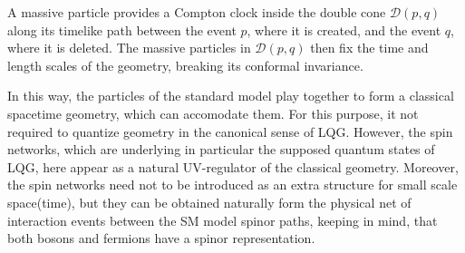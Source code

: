 \documentclass[11pt,a4paper]{article}
\theoremstyle{definition}
\begin{document}
	A massive particle provides a Compton clock inside the double cone $\mathcal{D}(p,q)$ along its timelike path between the event $p$, where it is created, and the event $q$, where it is deleted. 
	The massive particles in $\mathcal{D}(p,q)$ then fix the time and length scales of the geometry, breaking its conformal invariance. 
	
	In this way, the particles of the standard model play together to form a classical spacetime geometry,
	which can accomodate them. For this purpose, it not required to quantize geometry in the canonical 
	sense of LQG. However, the spin networks, which are underlying in particular the supposed quantum states of LQG, here appear as a natural UV-regulator of the classical geometry. Moreover, the spin networks need not to be introduced as an extra structure for small scale space(time), but they can be obtained naturally form the physical net of interaction events between the SM model spinor paths,
	keeping in mind, that both bosons and fermions have a spinor representation. 
	
	
	
	
\end{document}
